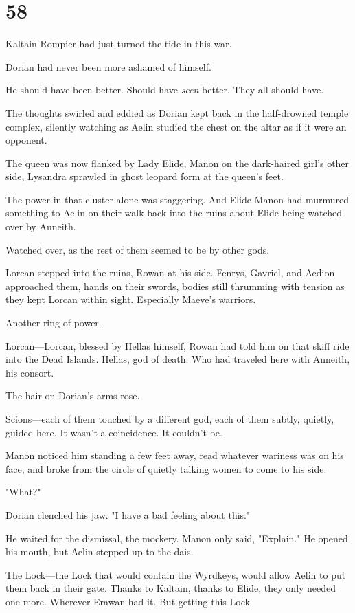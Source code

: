
\chapter{58}

Kaltain Rompier had just turned the tide in this war.

Dorian had never been more ashamed of himself.

He should have been better. Should have \emph{seen} better. They all should have.

The thoughts swirled and eddied as Dorian kept back in the half-drowned temple complex, silently watching as Aelin studied the chest on the altar as if it were an opponent.

The queen was now flanked by Lady Elide, Manon on the dark-haired girl's other side, Lysandra sprawled in ghost leopard form at the queen's feet.

The power in that cluster alone was staggering. And Elide  Manon had murmured something to Aelin on their walk back into the ruins about Elide being watched over by Anneith.

Watched over, as the rest of them seemed to be by other gods.

Lorcan stepped into the ruins, Rowan at his side. Fenrys, Gavriel, and Aedion approached them, hands on their swords, bodies still thrumming with tension as they kept Lorcan within sight. Especially Maeve's warriors.

Another ring of power.

Lorcan---Lorcan, blessed by Hellas himself, Rowan had told him on that skiff ride into the Dead Islands. Hellas, god of death. Who had traveled here with Anneith, his consort.

The hair on Dorian's arms rose.

Scions---each of them touched by a different god, each of them subtly, quietly, guided here. It wasn't a coincidence. It couldn't be.

Manon noticed him standing a few feet away, read whatever wariness was on his face, and broke from the circle of quietly talking women to come to his side.

"What?"

Dorian clenched his jaw. "I have a bad feeling about this."

He waited for the dismissal, the mockery. Manon only said, "Explain." He opened his mouth, but Aelin stepped up to the dais.

The Lock---the Lock that would contain the Wyrdkeys, would allow Aelin to put them back in their gate. Thanks to Kaltain, thanks to Elide, they only needed one more. Wherever Erawan had it. But getting this Lock


